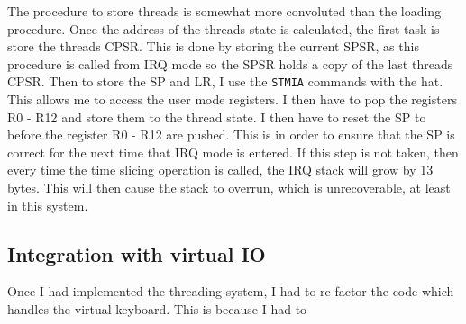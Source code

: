 The procedure to store threads is somewhat more convoluted than the loading procedure. Once the address of the threads state is calculated, the first task is store the threads CPSR. This is done by storing the current SPSR, as this procedure is called from IRQ mode so the SPSR holds a copy of the last threads CPSR. Then to store the SP and LR, I use the \verb|STMIA| commands with the hat. This allows me to access the user mode registers. I then have to pop the registers R0 - R12 and store them to the thread state. I then have to reset the SP to before the register R0 - R12 are pushed. This is in order to ensure that the SP is correct for the next time that IRQ mode is entered. If this step is not taken, then every time the time slicing operation is called, the IRQ stack will grow by 13 bytes. This will then cause the stack to overrun, which is unrecoverable, at least in this system.


\subsection{Integration with virtual IO}
Once I had implemented the threading system, I had to re-factor the code which handles the virtual keyboard. This is because I had to 























